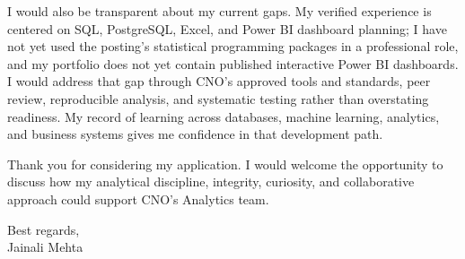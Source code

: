 \documentclass[letterpaper,11pt]{article}
\begin{document}
\bigbreak
I would also be transparent about my current gaps. My verified experience is centered on SQL, PostgreSQL, Excel, and Power BI dashboard planning; I have not yet used the posting's statistical programming packages in a professional role, and my portfolio does not yet contain published interactive Power BI dashboards. I would address that gap through CNO's approved tools and standards, peer review, reproducible analysis, and systematic testing rather than overstating readiness. My record of learning across databases, machine learning, analytics, and business systems gives me confidence in that development path.

\bigbreak
Thank you for considering my application. I would welcome the opportunity to discuss how my analytical discipline, integrity, curiosity, and collaborative approach could support CNO's Analytics team.

\bigbreak
Best regards,\\
Jainali Mehta
\end{document}
